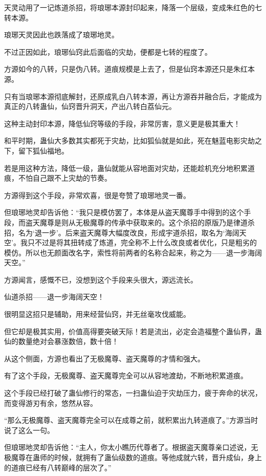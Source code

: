 \begin{this_body}
天灵动用了一记炼道杀招，将琅琊本源封印起来，降落一个层级，变成朱红色的七转本源。

琅琊天灵因此也跌落成了琅琊地灵。

不过正因如此，琅琊仙窍此后面临的灾劫，便都是七转的程度了。

方源如今的八转，只是伪八转。道痕规模是上去了，但是仙窍本源还只是朱红本源。

只有当琅琊本源彻底解封，还原成乳白八转本源，再让方源吞并融合后，才能成为真正的八转蛊仙，仙窍晋升洞天，产出八转白荔仙元。

这种主动封印本源，降低仙窍等级的手段，非常厉害，意义更是极其重大！

和平时期，蛊仙大多数其实都死于灾劫，比如狐仙就是如此，死在魅蓝电影灾劫之下，留下狐仙福地。

若是用这种方法，降低一级，蛊仙就能从容地面对灾劫，还能趁机充分地积累道痕，不怕自己跟不上灾劫的节奏。

方源得到这个手段，非常欢喜，很是夸赞了琅琊地灵一番。

但琅琊地灵却告诉他：“我只是模仿罢了，本体是从盗天魔尊手中得到的这个手段，而盗天魔尊是则从无极魔尊的传承中获取来的。这个杀招的原版乃是律道杀招，名为‘退一步’。后来盗天魔尊大幅度改良，形成宇道杀招，取名为‘海阔天空’。我只不过是将其扭转成了炼道，完全称不上什么改良或者优化，只是粗劣的模仿。所以也无颜面改名字，索性将前两者的名称合起来，称之为——退一步海阔天空。”

方源闻言，感慨不已，没想到这个手段来头很大，源远流长。

仙道杀招——退一步海阔天空！

很明显这招只是辅助，用来经营仙窍，并无丝毫攻伐威能。

但它却是极其实用，价值高得要突破天际！若是流出，必定会造福整个蛊仙界，蛊仙的数量绝对会暴涨数倍，数十倍！

从这个侧面，方源也看出了无极魔尊、盗天魔尊的才情和强大。

有了这个手段，无极魔尊、盗天魔尊完全可以从容地渡劫，不断地积累道痕。

这个手段已经打破了蛊仙修行的常态，一扫蛊仙迫于灾劫压力，疲于奔命的状况，而变得游刃有余，悠然从容。

“那么无极魔尊、盗天魔尊完全可以在成尊之前，就积累出九转道痕了。”方源当时说了这么一句。

但琅琊地灵却告诉他：“主人，你太小瞧历代尊者了。根据盗天魔尊亲口述说，无极魔尊在蛊师的时候，就拥有了蛊仙级数的道痕。等他成就六转，晋升成仙，身上的道痕已经有八转巅峰的层次了。”

\end{this_body}

